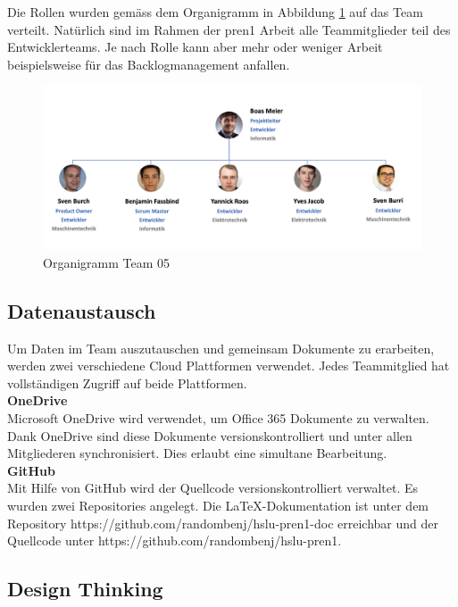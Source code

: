 Die Rollen wurden gemäss dem Organigramm in Abbildung \ref{fig:organigramm} auf das Team verteilt. Natürlich sind im Rahmen der \acrshort{pren1} Arbeit alle Teammitglieder teil des Entwicklerteams.
Je nach Rolle kann aber mehr oder weniger Arbeit beispielsweise für das Backlogmanagement anfallen.

\begin{figure}[H]
  \includegraphics[width=1.0\textwidth]{img/projektmanagement/Organigramm PREN2.png}
  \centering
  \caption{Organigramm Team 05}
  \label{fig:organigramm}
\end{figure}

\newpage

\subsection{Datenaustausch}
Um Daten im Team auszutauschen und gemeinsam Dokumente zu erarbeiten, werden zwei verschiedene Cloud Plattformen verwendet. Jedes Teammitglied hat vollständigen Zugriff auf beide Plattformen.\\

\textbf{OneDrive}\\
Microsoft OneDrive wird verwendet, um Office 365 Dokumente zu verwalten. Dank OneDrive sind diese Dokumente versionskontrolliert und unter allen Mitgliederen synchronisiert. Dies erlaubt eine simultane Bearbeitung.\\

\textbf{GitHub}\\
Mit Hilfe von GitHub wird der Quellcode versionskontrolliert verwaltet. Es wurden zwei Repositories angelegt. Die \LaTeX-Dokumentation ist unter dem Repository https://github.com/randombenj/hslu-pren1-doc erreichbar und der Quellcode unter https://github.com/randombenj/hslu-pren1.

\newpage

\subsection{Design Thinking}
\label{sec:design-thinking}


